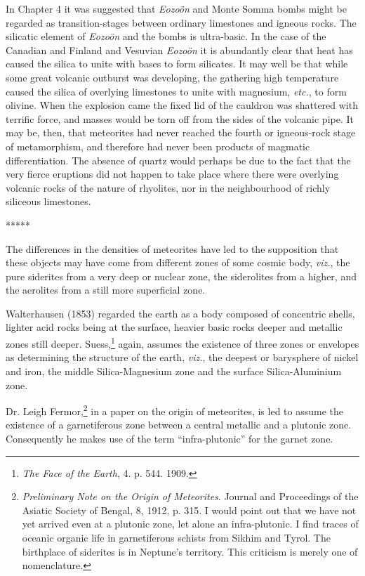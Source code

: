 \documentclass[a4paper, 12pt, oneside]{article}
\begin{document}
In Chapter 4 it was suggested that \emph{Eozoön} and Monte Somma bombs might be regarded as transition-stages between ordinary limestones and igneous rocks. The silicatic element of \emph{Eozoön} and the bombs is ultra-basic. In the case of the Canadian and Finland and Vesuvian \emph{Eozoön} it is abundantly clear that heat has caused the silica to unite with bases to form silicates. It may well be that while some great volcanic outburst was developing, the gathering high temperature caused the silica of overlying limestones to unite with magnesium, \emph{etc.}, to form olivine. When the explosion came the fixed lid of the cauldron was shattered with terrific force, and masses would be torn off from the sides of the volcanic pipe. It may be, then, that meteorites had never reached the fourth or igneous-rock stage of metamorphism, and therefore had never been products of magmatic differentiation. The absence of quartz would perhaps be due to the fact that the very fierce eruptions did not happen to take place where there were overlying volcanic rocks of the nature of rhyolites, nor in the neighbourhood of richly siliceous limestones.

\centerline{*\hspace{15mm}*\hspace{15mm}*\hspace{15mm}*\hspace{15mm}*}
\bigskip

The differences in the densities of meteorites have led to the supposition that these objects may have come from different zones of some cosmic body, \emph{viz.}, the pure siderites from a very deep or nuclear zone, the siderolites from a higher, and the aerolites from a still more superficial zone.

Walterhausen (1853) regarded the earth as a body composed of concentric shells, lighter acid rocks being at the surface, heavier basic rocks deeper and metallic zones still deeper. Suess,\footnote{\emph{The Face of the Earth}, 4. p. 544. 1909.} again, assumes the existence of three zones or envelopes as determining the structure of the earth, \emph{viz.}, the deepest or barysphere of nickel and iron, the middle Silica-Magnesium zone and the surface Silica-Aluminium zone.

Dr. Leigh Fermor,\footnote{\emph{Preliminary Note on the Origin of Meteorites}. Journal and Proceedings of the Asiatic Society of Bengal, 8, 1912, p. 315. I would point out that we have not yet arrived even at a plutonic zone, let alone an infra-plutonic. I find traces of oceanic organic life in garnetiferous schists from Sikhim and Tyrol. The birthplace of siderites is in Neptune's territory. This criticism is merely one of nomenclature.} in a paper on the origin of meteorites, is led to assume the existence of a garnetiferous zone between a central metallic and a plutonic zone. Consequently he makes use of the term ``infra-plutonic'' for the garnet zone.
\end{document}
